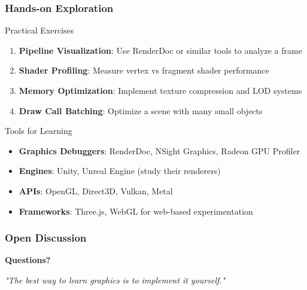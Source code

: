 \begin{frame}
\frametitle{Hands-on Exploration}

\begin{mathbox}{Practical Exercises}
\begin{enumerate}
    \item \textbf{Pipeline Visualization}: Use RenderDoc or similar tools to analyze a frame
    \item \textbf{Shader Profiling}: Measure vertex vs fragment shader performance
    \item \textbf{Memory Optimization}: Implement texture compression and LOD systems
    \item \textbf{Draw Call Batching}: Optimize a scene with many small objects
\end{enumerate}
\end{mathbox}

\begin{conceptbox}{Tools for Learning}
\begin{itemize}
    \item \textbf{Graphics Debuggers}: RenderDoc, NSight Graphics, Radeon GPU Profiler
    \item \textbf{Engines}: Unity, Unreal Engine (study their renderers)
    \item \textbf{APIs}: OpenGL, Direct3D, Vulkan, Metal
    \item \textbf{Frameworks}: Three.js, WebGL for web-based experimentation
\end{itemize}
\end{conceptbox}

\end{frame}

\begin{frame}
\frametitle{Open Discussion}

\begin{center}
\Large{\textbf{Questions?}}

\vspace{1cm}

\textit{"The best way to learn graphics is to implement it yourself."}

\vspace{1cm}

\end{center}

\end{frame}
